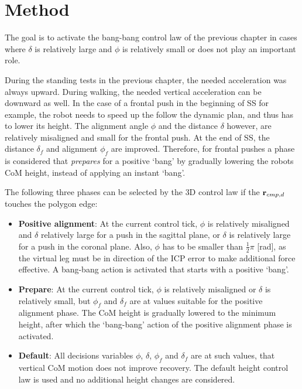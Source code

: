 \section{Method}
The goal is to activate the bang-bang control law of the previous chapter in cases where $\delta$ is relatively large and $\phi$ is relatively small or does not play an important role.

During the standing tests in the previous chapter, the needed acceleration was always upward. During walking, the needed vertical acceleration can be downward as well. In the case of a frontal push in the beginning of \ac{SS} for example, the robot needs to speed up the follow the dynamic plan, and thus has to lower its height. The alignment angle $\phi$ and the distance $\delta$ however, are relatively misaligned and small for the frontal push. At the end of \ac{SS}, the distance $\delta_f$ and alignment $\phi_f$ are improved. Therefore, for frontal pushes a phase is considered that \textit{prepares} for a positive `bang' by gradually lowering the robots \ac{CoM} height, instead of applying an instant `bang'.

The following three phases can be selected by the \ac{3D} control law if the $\mathbf{r}_{cmp,d}$ touches the polygon edge:
\begin{itemize}
	\item \textbf{Positive alignment}: At the current control tick, $\phi$ is relatively misaligned and $\delta$ relatively large for a push in the sagittal plane, or $\delta$ is relatively large for a push in the coronal plane. Also, $\phi$ has to be smaller than $\frac{1}{2}\pi$ [rad], as the virtual leg must be in direction of the \ac{ICP} error to make additional force effective. A bang-bang action is activated that starts with a positive `bang'.
	\item \textbf{Prepare}: At the current control tick, $\phi$ is relatively misaligned or $\delta$ is relatively small, but $\phi_f$ and $\delta_f$ are at values suitable for the positive alignment phase. The \ac{CoM} height is gradually lowered to the minimum height, after which the `bang-bang' action of the positive alignment phase is activated.
	\item \textbf{Default}: All decisions variables $\phi$, $\delta$, $\phi_f$ and $\delta_f$ are at such values, that vertical \ac{CoM} motion does not improve recovery. The default height control law is used and no additional height changes are considered.
\end{itemize}

